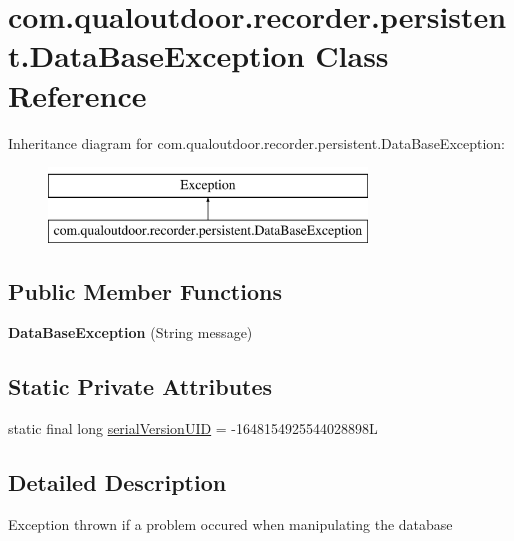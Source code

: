 \hypertarget{classcom_1_1qualoutdoor_1_1recorder_1_1persistent_1_1DataBaseException}{\section{com.\-qualoutdoor.\-recorder.\-persistent.\-Data\-Base\-Exception Class Reference}
\label{classcom_1_1qualoutdoor_1_1recorder_1_1persistent_1_1DataBaseException}
}
Inheritance diagram for com.\-qualoutdoor.\-recorder.\-persistent.\-Data\-Base\-Exception\-:\begin{figure}[H]
\begin{center}
\leavevmode
\includegraphics[height=2.000000cm]{classcom_1_1qualoutdoor_1_1recorder_1_1persistent_1_1DataBaseException}
\end{center}
\end{figure}
\subsection*{Public Member Functions}
\begin{DoxyCompactItemize}
\item 
\hypertarget{classcom_1_1qualoutdoor_1_1recorder_1_1persistent_1_1DataBaseException_a92c8769073950051e7798ee71fa7ae2d}{{\bfseries Data\-Base\-Exception} (String message)}\label{classcom_1_1qualoutdoor_1_1recorder_1_1persistent_1_1DataBaseException_a92c8769073950051e7798ee71fa7ae2d}

\end{DoxyCompactItemize}
\subsection*{Static Private Attributes}
\begin{DoxyCompactItemize}
\item 
static final long \hyperlink{classcom_1_1qualoutdoor_1_1recorder_1_1persistent_1_1DataBaseException_ac46ea235d94fa0330db26414b56b3ed2}{serial\-Version\-U\-I\-D} = -\/1648154925544028898\-L
\end{DoxyCompactItemize}


\subsection{Detailed Description}
Exception thrown if a problem occured when manipulating the database 

